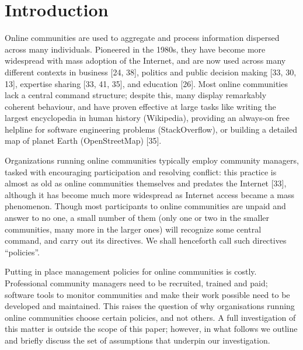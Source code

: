 \section{Introduction}

Online communities are used to aggregate and process information dispersed across many individuals. Pioneered in the 1980s, they have become more widespread with mass adoption of the Internet, and are now used across many different contexts in business [24, 38], politics and public decision making [33, 30, 13], expertise sharing [33, 41, 35], and education [26]. Most online communities lack a central command structure; despite this, many display remarkably coherent behaviour, and have proven effective at large tasks like writing the largest encyclopedia in human history (Wikipedia), providing an always-on free helpline for software engineering problems (StackOverflow), or building a detailed map of planet Earth (OpenStreetMap) [35]. 

Organizations running online communities typically employ community managers, tasked with encouraging participation and resolving conflict: this practice is almost as old as online communities themselves and predates the Internet [33], although it has become much more widespread as Internet access became a mass phenomenon. Though most participants to online communities are unpaid and answer to no one, a small number of them (only one or two in the smaller communities, many more in the larger ones) will recognize some central command, and carry out its directives. We shall henceforth call such directives “policies”. 

Putting in place management policies for online communities is costly. Professional community managers need to be recruited, trained and paid; software tools to monitor communities and make their work possible need to be developed and maintained. This raises the question of why organisations running online communities choose certain policies, and not others. A full investigation of this matter is outside the scope of this paper; however, in what follows we outline and briefly discuss the set of assumptions that underpin our investigation. 

